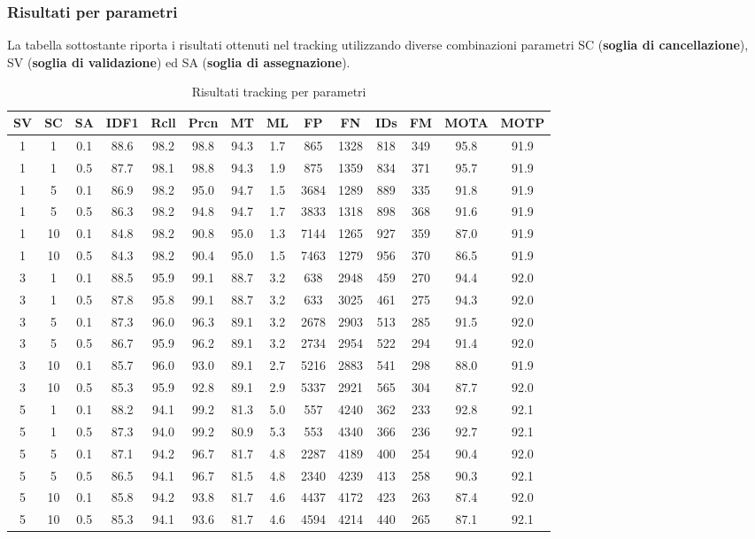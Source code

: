 \subsubsection{Risultati per parametri}
La tabella sottostante riporta i risultati ottenuti nel tracking  utilizzando diverse combinazioni parametri SC (\textbf{soglia di cancellazione}), SV (\textbf{soglia di validazione}) ed SA (\textbf{soglia di assegnazione}).
\begin{table}[h!]
\centering
\begin{tabular}{|c|c|c|c|c|c|c|c|c|c|c|c|c|c|}
\hline
SV & SC & SA & IDF1 & Rcll & Prcn & MT & ML & FP & FN & IDs & FM & MOTA & MOTP\\ [0.5ex] 
\hline
1 & 1 & 0.1 & 88.6 & 98.2 & 98.8 & 94.3 & 1.7 & 865 & 1328 & 818 & 349 & 95.8 & 91.9\\
1 & 1 & 0.5 & 87.7 & 98.1 & 98.8 & 94.3 & 1.9 & 875 & 1359 & 834 & 371 & 95.7 & 91.9\\
1 & 5 & 0.1 & 86.9 & 98.2 & 95.0 & 94.7 & 1.5 & 3684 & 1289 & 889 & 335 & 91.8 & 91.9\\
1 & 5 & 0.5 & 86.3 & 98.2 & 94.8 & 94.7 & 1.7 & 3833 & 1318 & 898 & 368 & 91.6 & 91.9\\
1 & 10 & 0.1 & 84.8 & 98.2 & 90.8 & 95.0 & 1.3 & 7144 & 1265 & 927 & 359 & 87.0 & 91.9\\
1 & 10 & 0.5 & 84.3 & 98.2 & 90.4 & 95.0 & 1.5 & 7463 & 1279 & 956 & 370 & 86.5 & 91.9\\
3 & 1 & 0.1 & 88.5 & 95.9 & 99.1 & 88.7 & 3.2 & 638 & 2948 & 459 & 270 & 94.4 & 92.0\\
3 & 1 & 0.5 & 87.8 & 95.8 & 99.1 & 88.7 & 3.2 & 633 & 3025 & 461 & 275 & 94.3 & 92.0\\
3 & 5 & 0.1 & 87.3 & 96.0 & 96.3 & 89.1 & 3.2 & 2678 & 2903 & 513 & 285 & 91.5 & 92.0\\
3 & 5 & 0.5 & 86.7 & 95.9 & 96.2 & 89.1 & 3.2 & 2734 & 2954 & 522 & 294 & 91.4 & 92.0\\
3 & 10 & 0.1 & 85.7 & 96.0 & 93.0 & 89.1 & 2.7 & 5216 & 2883 & 541 & 298 & 88.0 & 91.9\\
3 & 10 & 0.5 & 85.3 & 95.9 & 92.8 & 89.1 & 2.9 & 5337 & 2921 & 565 & 304 & 87.7 & 92.0\\
5 & 1 & 0.1 & 88.2 & 94.1 & 99.2 & 81.3 & 5.0 & 557 & 4240 & 362 & 233 & 92.8 & 92.1\\
5 & 1 & 0.5 & 87.3 & 94.0 & 99.2 & 80.9 & 5.3 & 553 & 4340 & 366 & 236 & 92.7 & 92.1\\
5 & 5 & 0.1 & 87.1 & 94.2 & 96.7 & 81.7 & 4.8 & 2287 & 4189 & 400 & 254 & 90.4 & 92.0\\
5 & 5 & 0.5 & 86.5 & 94.1 & 96.7 & 81.5 & 4.8 & 2340 & 4239 & 413 & 258 & 90.3 & 92.1\\
5 & 10 & 0.1 & 85.8 & 94.2 & 93.8 & 81.7 & 4.6 & 4437 & 4172 & 423 & 263 & 87.4 & 92.0\\
5 & 10 & 0.5 & 85.3 & 94.1 & 93.6 & 81.7 & 4.6 & 4594 & 4214 & 440 & 265 & 87.1 & 92.1\\
\hline
\end{tabular}
\caption{Risultati tracking per parametri}
\label{risultati tracking per parametri}
\end{table}
